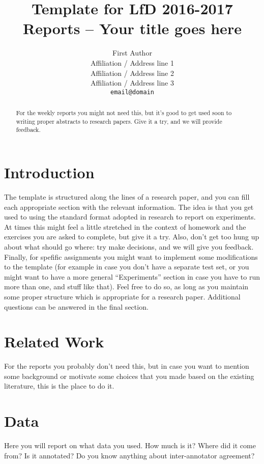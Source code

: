 \documentclass[11pt]{article}
\title{Template for LfD 2016-2017 Reports -- Your title goes here}
\author{First Author \\
  Affiliation / Address line 1 \\
  Affiliation / Address line 2 \\
  Affiliation / Address line 3 \\
  {\tt email@domain}}
\date{}
\begin{document}
\maketitle
\begin{abstract}
 For the weekly reports you might not need this, but it's good to get used soon to writing proper abstracts to research papers. Give it a try, and we will provide feedback.
 \end{abstract}



\section{Introduction}

 The template is structured along the lines of a research paper, and you can fill each appropriate section with the relevant information. The idea is that you get used to using the standard format adopted in research to report on experiments. At times this might feel a little stretched in the context of homework and the exercises you are asked to complete, but give it a try. Also, don't get too hung up about what should go where: try make decisions, and we will give you feedback. Finally, for spefific assignments you might want to implement some modifications to the template (for example in case you don't have a separate test set, or you might want to have a more general ``Experiments'' section in case you have to run more than one, and stuff like that). Feel free to do so, as long as you maintain some proper structure which is appropriate for a research paper. Additional questions can be answered in the final section.

\section{Related Work}

For the reports you probably don't need this, but in case you want to mention some background or motivate some choices that you made based on the existing literature, this is the place to do it.

\section{Data}

Here you will report on what data you used.  How much is it?  Where did it come from? Is it annotated? Do you know anything about inter-annotator agreement?
\end{document}
